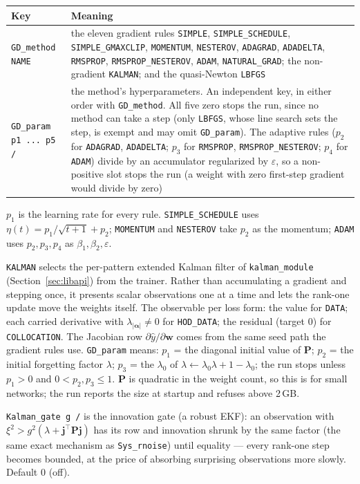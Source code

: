 \documentclass[10pt,a4paper]{article}
\newcommand{\code}[1]{\texttt{#1}}
\newcommand{\mi}[1]{\boldsymbol{#1}}
\begin{document}
\begin{longtable}{@{}p{}p{}@{}}
\toprule
Key & Meaning \\
\midrule
\endhead
\code{GD\_method NAME} & the eleven gradient rules \code{SIMPLE}, \code{SIMPLE\_SCHEDULE}, \code{SIMPLE\_GMAXCLIP}, \code{MOMENTUM}, \code{NESTEROV}, \code{ADAGRAD}, \code{ADADELTA}, \code{RMSPROP}, \code{RMSPROP\_NESTEROV}, \code{ADAM}, \code{NATURAL\_GRAD}; the non-gradient \code{KALMAN}; and the quasi-Newton \code{LBFGS}\\
\code{GD\_param p1 ... p5 /} & the method's hyperparameters. An independent key, in either order with \code{GD\_method}. All five zero stops the run, since no method can take a step (only \code{LBFGS}, whose line search sets the step, is exempt and may omit \code{GD\_param}). The adaptive rules ($p_2$ for \code{ADAGRAD}, \code{ADADELTA}; $p_3$ for \code{RMSPROP}, \code{RMSPROP\_NESTEROV}; $p_4$ for \code{ADAM}) divide by an accumulator regularized by $\varepsilon$, so a non-positive slot stops the run (a weight with zero first-step gradient would divide by zero)\\
\bottomrule
\end{longtable}

$p_1$ is the learning rate for every rule. \code{SIMPLE\_SCHEDULE}
uses $\eta(t)=p_1/\sqrt{t+1}+p_2$; \code{MOMENTUM} and
\code{NESTEROV} take $p_2$ as the momentum; \code{ADAM} uses
$p_2,p_3,p_4$ as $\beta_1,\beta_2,\varepsilon$.

\code{KALMAN} selects the per-pattern extended Kalman filter of
\code{kalman\_module} (Section~\ref{sec:libapi}) from the trainer.
Rather than accumulating a gradient and stepping once, it presents
scalar observations one at a time and lets the rank-one update move
the weights itself. The observable per loss form: the value for
\code{DATA}; each carried derivative with
$\lambda_{|\mi\alpha|}\ne 0$ for \code{HOD\_DATA}; the residual
(target 0) for \code{COLLOCATION}. The Jacobian row
$\partial\hat y/\partial\mi{w}$ comes from the same seed path the
gradient rules use. \code{GD\_param} means: $p_1$ = the diagonal
initial value of $\mi{P}$; $p_2$ = the initial forgetting factor
$\lambda$; $p_3$ = the $\lambda_0$ of
$\lambda\leftarrow\lambda_0\lambda+1-\lambda_0$; the run stops unless
$p_1>0$ and $0<p_2,p_3\le 1$. $\mi{P}$ is quadratic in the weight
count, so this is for small networks; the run reports the size at
startup and refuses above 2\,GB.

\code{Kalman\_gate g /} is the innovation gate (a robust EKF): an
observation with $\xi^2 > g^2(\lambda + \mi{j}^{\top}\mi{P}\mi{j})$
has its row and innovation shrunk by the same factor (the same exact
mechanism as \code{Sys\_rnoise}) until equality --- every rank-one
step becomes bounded, at the price of absorbing surprising
observations more slowly. Default 0 (off).
\end{document}
